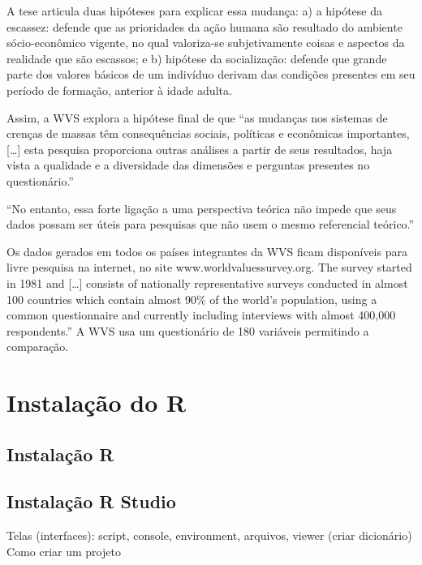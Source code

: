 \documentclass[
]{book}
\begin{document}
A tese articula duas hipóteses para explicar essa mudança: a) a hipótese da escassez: defende que as prioridades da ação humana são resultado do ambiente sócio-econômico vigente, no qual valoriza-se subjetivamente coisas e aspectos da realidade que são escassos; e b) hipótese da socialização: defende que grande parte dos valores básicos de um indivíduo derivam das condições presentes em seu período de formação, anterior à idade adulta.

Assim, a WVS explora a hipótese final de que ``as mudanças nos sistemas de crenças de massas têm consequências sociais, políticas e econômicas importantes, {[}\ldots{]} esta pesquisa proporciona outras análises a partir de seus resultados, haja vista a qualidade e a diversidade das dimensões e perguntas presentes no questionário.'' \citep{castro_conteudo_2015}

``No entanto, essa forte ligação a uma perspectiva teórica não impede que seus dados possam ser úteis para pesquisas que não usem o mesmo referencial teórico.'' \citep{castro_conteudo_2015}

Os dados gerados em todos os países integrantes da WVS ficam disponíveis para livre pesquisa na internet, no site www.worldvaluessurvey.org. The survey started in 1981 and {[}\ldots{]} consists of nationally representative surveys conducted in almost 100 countries which contain almost 90\% of the world's population, using a common questionnaire and currently including interviews with almost 400,000 respondents.'' A WVS usa um questionário de 180 variáveis permitindo a comparação.

\hypertarget{instalauxe7uxe3o-do-r}{%
\chapter{Instalação do R}\label{instalauxe7uxe3o-do-r}}

\hypertarget{instalauxe7uxe3o-r}{%
\section{Instalação R}\label{instalauxe7uxe3o-r}}

\hypertarget{instalauxe7uxe3o-r-studio}{%
\section{Instalação R Studio}\label{instalauxe7uxe3o-r-studio}}

Telas (interfaces): script, console, environment, arquivos, viewer (criar dicionário)
Como criar um projeto
\end{document}
